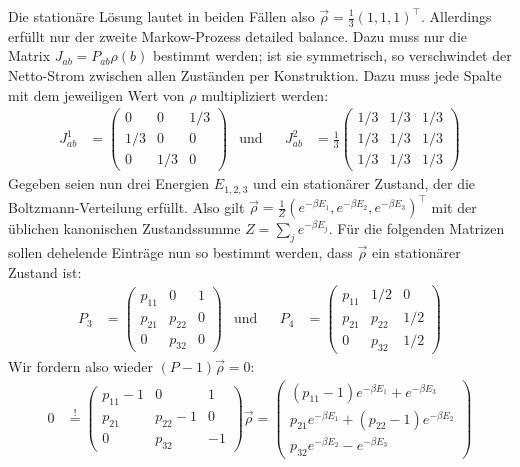 \documentclass[a4paper,12pt]{article}
\newcommand{\kla}{}
\newcommand{\tecxt}{}
\begin{document}
Die stationäre Lösung lautet in beiden Fällen also $\vec{\rho}=\frac{1}{3}(1,1,1)^\top$. Allerdings erfüllt nur der zweite Markow-Prozess detailed balance. Dazu muss nur die Matrix $J_{ab}=P_{ab}\rho(b)$ bestimmt werden; ist sie symmetrisch, so verschwindet der Netto-Strom zwischen allen Zuständen per Konstruktion. Dazu muss jede Spalte mit dem jeweiligen Wert von $\rho$ multipliziert werden:
\begin{align*}
J_{ab}^1&=\begin{pmatrix}
0&0&1/3 \\ 1/3&0&0 \\ 0&1/3&0
\end{pmatrix}&\tecxt\text{und}&&J_{ab}^2&=\frac{1}{3}\begin{pmatrix}
1/3&1/3&1/3 \\ 1/3&1/3&1/3 \\ 1/3&1/3&1/3
\end{pmatrix}
\end{align*}
Gegeben seien nun drei Energien $E_{1,2,3}$ und ein stationärer Zustand, der die Boltzmann-Verteilung erfüllt. Also gilt $\vec{\rho}=\frac{1}{Z}\kla\left( {e^{-\beta E_1}, e^{-\beta E_2}, e^{-\beta E_3}} \right)^\top$ mit der üblichen kanonischen Zustandssumme $Z=\sum_j e^{-\beta E_j}$. Für die folgenden Matrizen sollen dehelende Einträge nun so bestimmt werden, dass $\vec{\rho}$ ein stationärer Zustand ist:
\begin{align*}
P_3&=\begin{pmatrix}
p_{11}&0&1 \\ p_{21}&p_{22}&0 \\ 0&p_{32}&0
\end{pmatrix}&\tecxt\text{und}&&P_4&=\begin{pmatrix}
p_{11}&1/2&0 \\ p_{21}&p_{22}&1/2 \\ 0&p_{32}&1/2
\end{pmatrix}
\end{align*}
Wir fordern also wieder $(P-1)\vec{\rho}=0$:
\begin{align*}
0&\overset{!}{=}\begin{pmatrix}
p_{11}-1&0&1 \\ p_{21}&p_{22}-1&0 \\ 0&p_{32}&-1
\end{pmatrix}\vec{\rho}=\begin{pmatrix}
(p_{11}-1)e^{-\beta E_1}+e^{-\beta E_3} \\
p_{21}e^{-\beta E_1} + (p_{22}-1)e^{-\beta E_2} \\
p_{32}e^{-\beta E_2}-e^{-\beta E_3}
\end{pmatrix}
\end{align*}
\end{document}
